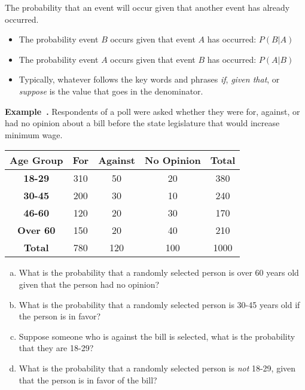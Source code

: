 \documentclass{article}
\newcounter{example}[section]
\newenvironment{example}[1][]{\refstepcounter{example}\par\medskip
   {\color{red}\textbf{Example~\theexample. #1}}}{\medskip}
\begin{document}
\begin{tcolorbox}[colframe=black!20!white, opacitybacktitle=0.1, coltitle=black, title=\textbf{Conditional Probability}]
The probability that an event will occur given that another event has already occurred. \newline 

\begin{itemize}
    \item The probability event $B$ occurs given that event $A$ has occurred: $P(B|A)$
    \item The probability event $A$ occurs given that event $B$ has occurred: $P(A|B)$
    \item Typically, whatever follows the key words and phrases \textit{if}, \textit{given that}, or \textit{suppose} is the value that goes in the denominator.
\end{itemize}
\end{tcolorbox}

\newpage 

\begin{example}
Respondents of a poll were asked whether they were for, against, or had no opinion about a bill before the state legislature that would increase minimum wage.

\begin{center}
    \begin{tabular}{c|c|c|c|c}
        \textbf{Age Group} & \textbf{For} & \textbf{Against} & \textbf{No Opinion} & \textbf{Total} \\ \hline 
        \textbf{18-29} & 310 & 50 & 20 & 380 \\ \hline 
        \textbf{30-45} & 200 & 30 & 10 & 240 \\ \hline 
        \textbf{46-60} & 120 & 20 & 30 & 170 \\ \hline 
        \textbf{Over 60} & 150 & 20 & 40 & 210 \\ \hline 
        \textbf{Total} & 780 & 120 & 100 & 1000
    \end{tabular}
\end{center}

\begin{enumerate}[(a)]
    \item What is the probability that a randomly selected person is over 60 years old given that the person had no opinion?
    \vfill 
    \item What is the probability that a randomly selected person is 30-45 years old if the person is in favor?
    \vfill
    \item Suppose someone who is against the bill is selected, what is the probability that they are 18-29?
    \vfill
    \item What is the probability that a randomly selected person is \emph{not} 18-29, given that the person is in favor of the bill?
\end{enumerate}
\end{example}
\vfill
\end{document}
